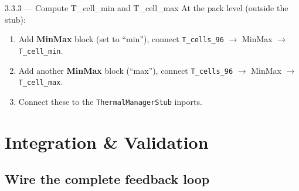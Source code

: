 \documentclass[11pt,a4paper]{article}
\begin{document}
\begin{guistep}{3.3.3 — Compute T\_cell\_min and T\_cell\_max}
At the pack level (outside the stub):
\begin{enumerate}
    \item Add \textbf{MinMax} block (set to ``min''), connect \texttt{T\_cells\_96} $\to$ MinMax $\to$ \texttt{T\_cell\_min}.
    \item Add another \textbf{MinMax} block (``max''), connect \texttt{T\_cells\_96} $\to$ MinMax $\to$ \texttt{T\_cell\_max}.
    \item Connect these to the \texttt{ThermalManagerStub} inports.
\end{enumerate}
\end{guistep}


\newpage
\section{Integration \& Validation}

\subsection{Wire the complete feedback loop}
\end{document}
